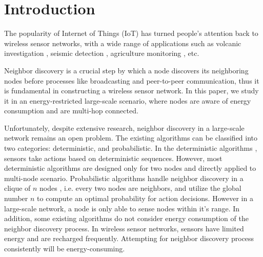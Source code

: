 \section{Introduction}







The popularity of Internet of Things (IoT) has turned people's attention back to wireless sensor networks\cite{akyildiz2002wireless}, with a wide range of applications such as volcanic investigation \cite{werner2006deploying}, seismic detection \cite{suzuki2007high}, agriculture monitoring \cite{wang2010l3sn}, etc. 

Neighbor discovery is a crucial step by which a node discovers its neighboring nodes before processes like broadcasting and peer-to-peer communication, thus it is fundamental in constructing a wireless sensor network. In this paper, we study it in an energy-restricted large-scale scenario, where nodes are aware of energy consumption and  are multi-hop connected.


Unfortunately, despite extensive research, neighbor discovery in a large-scale network remains an open problem.
The existing algorithms can be classified into two categories: deterministic, and probabilistic.
In the deterministic algorithms \cite{dutta2008practical, kandhalu2010u, bakht2012searchlight, sun2014hello,  chen2015heterogeneous}, sensors take actions based on deterministic sequences.
However, most deterministic algorithms are designed only for two nodes and directly applied to multi-node scenario. Probabilistic algorithms handle neighbor discovery in a clique of $n$ nodes\cite{mcglynn2001birthday, vasudevan2009neighbor, you2011aloha, song2014probabilistic} , i.e. every two nodes are neighbors, and utilize the global number $n$ to compute an optimal probability for action decisions. However in a large-scale network, a node is only able to sense nodes within it's range. In addition, some existing algorithms \cite{mcglynn2001birthday,vasudevan2009neighbor} do not consider energy consumption of the neighbor discovery process. In wireless sensor networks, sensors have limited energy and are recharged frequently. Attempting for neighbor discovery process consistently will be energy-consuming. 

